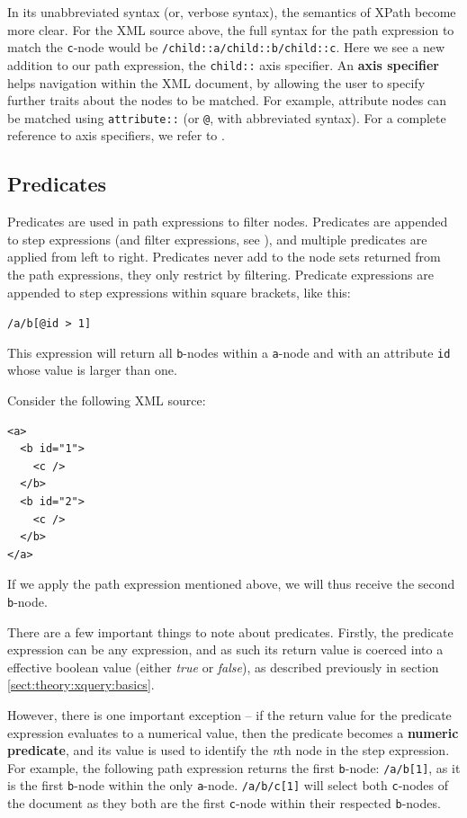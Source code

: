 In its unabbreviated syntax (or, verbose syntax), the semantics of XPath
become more clear. For the XML source above, the full syntax for the path
expression to match the \verb!c!-node would be
\texttt{/child::a/child::b/child::c}. Here we see a new addition to our path
expression, the \verb!child::! axis specifier. An \textbf{axis specifier} helps
navigation within the XML document, by allowing the user to specify further
traits about the nodes to be matched. For example, attribute nodes can be
matched using \verb!attribute::! (or \verb!@!, with abbreviated syntax). For a
complete reference to axis specifiers, we refer to \cite{w3c01}.

\subsection{Predicates}
\label{sect:theory:xquery:Predicates}
Predicates are used in path expressions to filter nodes. Predicates are
appended to step expressions (and filter expressions, see \cite{w3c01}), and multiple predicates
are applied from left to right. Predicates never add to the node sets returned from the path expressions, they
only restrict by filtering. Predicate expressions are appended to step expressions within square brackets, like
this:
\begin{center}
\verb!/a/b[@id > 1]!
\end{center} 
This expression will return all \verb!b!-nodes within a \verb!a!-node and with an attribute \verb!id! whose value
is larger than one.

Consider the following XML source:
\begin{center}
\begin{minipage}[h]{3.2cm}
\begin{verbatim}
<a>
  <b id="1">
    <c />
  </b>
  <b id="2">
    <c />
  </b>
</a>
\end{verbatim}
\end{minipage}
\end{center}
If we apply the path expression mentioned above, we will thus receive the second
\verb!b!-node.

There are a few important things to note about predicates. Firstly, the
predicate expression can be any expression, and as such its return value is
coerced into a effective boolean value (either \textit{true} or \textit{false}), as
described previously in section \ref{sect:theory:xquery:basics}.

However, there is one important exception -- if the return value for the
predicate expression evaluates to a numerical value, then the predicate
becomes a \textbf{numeric predicate}, and its value is used to identify the
\textit{n}th node in the step expression. For example, the following path
expression returns the first \verb!b!-node: \verb!/a/b[1]!, as it is the first
\verb!b!-node within the only \verb!a!-node. \texttt{/a/b/c[1]} will select both \verb!c!-nodes of the document as they both are the first
\texttt{c}-node within their respected \texttt{b}-nodes.


